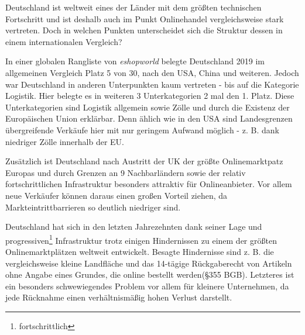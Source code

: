\iffalse

deu: 14-tage rückgabe durch §355 BGB

https://www.worldretailcongress.com/__media/Global_ecommerce_Market_Ranking_2019_001.pdf
\cite{esworld} 

--> 
    63.9mio online shoppers, D ist ein land in dem es den onlinehandel schon lange gibt
    
<--


einleitung: schlüsse aus ländern, die onlinehandel stärker nutzen, ziehen; jedoch ist D. schon vorreiter also wenig info
\fi


Deutschland ist weltweit eines der Länder mit dem größten technischen Fortschritt und ist deshalb auch im Punkt Onlinehandel vergleichsweise stark vertreten. Doch in welchen Punkten unterscheidet sich die Struktur dessen in einem internationalen Vergleich?

In einer globalen Rangliste von \emph{eshopworld} belegte Deutschland 2019 im allgemeinen Vergleich Platz 5 von 30, nach den USA, China und weiteren\cite[S. 3]{esworld}. Jedoch war Deutschland in anderen Unterpunkten kaum vertreten - bis auf die Kategorie Logistik. Hier belegte es in weiteren 3 Unterkategorien 2 mal den 1. Platz\cite[S. 10ff]{esworld}. Diese Unterkategorien sind Logistik allgemein sowie Zölle und durch die Existenz der Europäischen Union erklärbar. Denn ählich wie in den USA\cite[S. 4]{esworld} sind Landesgrenzen übergreifende Verkäufe hier mit nur geringem Aufwand möglich - z. B. dank niedriger Zölle innerhalb der EU.%

Zusätzlich ist Deutschland nach Austritt der UK der größte Onlinemarktpatz Europas und durch Grenzen an 9 Nachbarländern sowie der relativ fortschrittlichen Infrastruktur besonders attraktiv für Onlineanbieter. Vor allem neue Verkäufer können daraus einen großen Vorteil ziehen, da Markteintrittbarrieren so deutlich niedriger sind\cite[S. 8]{esworld}.

Deutschland hat sich in den letzten Jahrezehnten dank seiner Lage und progressiven\footnote{fortschrittlich} Infrastruktur trotz einigen Hindernissen zu einem der größten Onlinemarktplätzen weltweit entwickelt. Besagte Hindernisse sind z. B. die vergleichsweise kleine Landfläche und das 14-tägige Rückgaberecht von Artikeln ohne Angabe eines Grundes, die online bestellt werden(§355 BGB). Letzteres ist ein besonders schwewiegendes Problem vor allem für kleinere Unternehmen, da jede Rücknahme einen verhältnismäßig hohen Verlust darstellt\cite{retourwahnsinn}.

